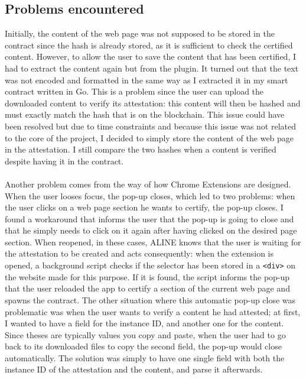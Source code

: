 \subsection{Problems encountered}

Initially, the content of the web page was not supposed to be stored in the contract since the hash is already stored, as it is sufficient to check the certified content. However, to allow the user to save the content that has been certified, I had to extract the content again but from the plugin. It turned out that the text was not encoded and formatted in the same way as I extracted it in my smart contract written in Go. This is a problem since the user can upload the downloaded content to verify its attestation: this content will then be hashed and must exactly match the hash that is on the blockchain. This issue could have been resolved but due to time constraints and because this issue was not related to the core of the project, I decided to simply store the content of the web page in the attestation. I still compare the two hashes when a content is verified despite having it in the contract.

\paragraph{}
Another problem comes from the way of how Chrome Extensions are designed. When the user looses focus, the pop-up closes, which led to two problems: when the user clicks on a web page section he wants to certify, the pop-up closes. I found a workaround that informs the user that the pop-up is going to close and that he simply needs to click on it again after having clicked on the desired page section. When reopened, in these cases, ALINE knows that the user is waiting for the attestation to be created and acts consequently: when the extension is opened, a background script checks if the selector has been stored in a \texttt{<div>} on the website made for this purpose. If it is found, the script informs the pop-up that the user reloaded the app to certify a section of the current web page and spawns the contract.
The other situation where this automatic pop-up close was problematic was when the user wants to verify a content he had attested; at first, I wanted to have a field for the instance ID, and another one for the content. Since theses are typically values you copy and paste, when the user had to go back to its downloaded files to copy the second field, the pop-up would close automatically. The solution was simply to have one single field with both the instance ID of the attestation and the content, and parse it afterwards.

